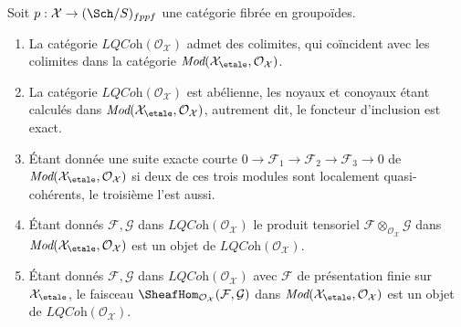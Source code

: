 \begin{lemma}
\label{lemma-lqc-colimits}
Soit $p : \mathcal{X} \to (\Sch/S)_{fppf}$ une catégorie fibrée en
groupoïdes.
\begin{enumerate}
\item La catégorie $\textit{LQCoh}(\mathcal{O}_\mathcal{X})$
admet des colimites, qui coïncident avec les colimites dans la catégorie
$\textit{Mod}(\mathcal{X}_\etale, \mathcal{O}_\mathcal{X})$.
\item La catégorie $\textit{LQCoh}(\mathcal{O}_\mathcal{X})$
est abélienne, les noyaux et conoyaux étant calculés dans
$\textit{Mod}(\mathcal{X}_\etale, \mathcal{O}_\mathcal{X})$,
autrement dit, le foncteur d'inclusion est exact.
\item Étant donnée une suite exacte courte
$0 \to \mathcal{F}_1 \to \mathcal{F}_2 \to \mathcal{F}_3 \to 0$ de
$\textit{Mod}(\mathcal{X}_\etale, \mathcal{O}_\mathcal{X})$
si deux de ces trois modules sont localement quasi-cohérents, le troisième l'est aussi.
\item Étant donnés $\mathcal{F}, \mathcal{G}$ dans
$\textit{LQCoh}(\mathcal{O}_\mathcal{X})$
le produit tensoriel $\mathcal{F} \otimes_{\mathcal{O}_\mathcal{X}} \mathcal{G}$
dans $\textit{Mod}(\mathcal{X}_\etale, \mathcal{O}_\mathcal{X})$
est un objet de $\textit{LQCoh}(\mathcal{O}_\mathcal{X})$.
\item Étant donnés $\mathcal{F}, \mathcal{G}$ dans
$\textit{LQCoh}(\mathcal{O}_\mathcal{X})$
avec $\mathcal{F}$ de présentation finie sur
$\mathcal{X}_\etale$, le faisceau
$\SheafHom_{\mathcal{O}_\mathcal{X}}(\mathcal{F}, \mathcal{G})$
dans $\textit{Mod}(\mathcal{X}_\etale, \mathcal{O}_\mathcal{X})$
est un objet de $\textit{LQCoh}(\mathcal{O}_\mathcal{X})$.
\end{enumerate}
\end{lemma}

